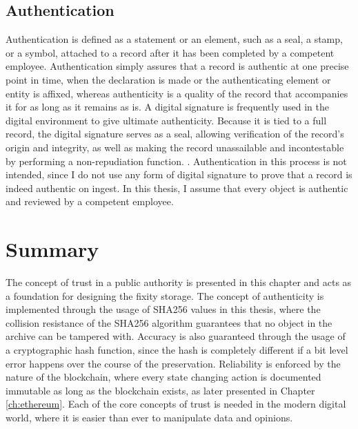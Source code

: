 \subsection{Authentication}
Authentication is defined as a statement or an element, such as a seal, a stamp, or a symbol, attached to a record after it has been completed by a competent employee. Authentication simply assures that a record is authentic at one precise point in time, when the declaration is made or the authenticating element or entity is affixed, whereas authenticity is a quality of the record that accompanies it for as long as it remains as is. A digital signature is frequently used in the digital environment to give ultimate authenticity. Because it is tied to a full record, the digital signature serves as a seal, allowing verification of the record's origin and integrity, as well as making the record unassailable and incontestable by performing a non-repudiation function. \cite[53]{duranti2009digital}.
Authentication in this process is not intended, since I do not use any form of digital signature to prove that a record is indeed authentic on ingest. In this thesis, I assume that every object is authentic and reviewed by a competent employee.

\section{Summary}
The concept of trust in a public authority is presented in this chapter and acts as a foundation for designing the fixity storage. The concept of authenticity is implemented through the usage of SHA256 values in this thesis, where the collision resistance of the SHA256 algorithm guarantees that no object in the archive can be tampered with. Accuracy is also guaranteed through the usage of a cryptographic hash function, since the hash is completely different if a bit level error happens over the course of the preservation.
Reliability is enforced by the nature of the blockchain, where every state changing action is documented immutable as long as the blockchain exists, as later presented in Chapter \ref{ch:ethereum}. Each of the core concepts of trust is needed in the modern digital world, where it is easier than ever to manipulate data and opinions.